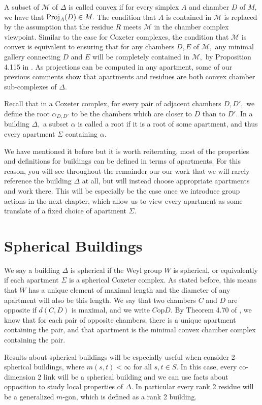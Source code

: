 \documentclass[class=book, crop=false,12 pt]{standalone}
\begin{document}
A subset of $\mathcal{M}$ of $\Delta$ is called convex if for every simplex $A$ and chamber $D$ of $M,$ we have that $\mathrm{Proj}_A(D)\in M.$ The condition that $A$ is contained in $\mathcal{M}$ is replaced by the assumption that the residue $R$ meets $\mathcal{M}$ in the chamber complex viewpoint. Similar to the case for Coxeter complexes, the condition that $\mathcal{M}$ is convex is equivalent to ensuring that for any chambers $D,E$ of $\mathcal{M},$ any minimal gallery connecting $D$ and $E$ will be completely contained in $\mathcal{M},$ by Proposition 4.115 in \cite{buildings}. As projections  can be computed in any apartment, some of our previous comments show that apartments and residues are both convex chamber sub-complexes of $\Delta.$

Recall that in a Coxeter complex, for every pair of adjacent chambers $D,D',$ we define the root $\alpha_{D,D'}$ to be the chambers which are closer to $D$ than to $D'.$ In a building $\Delta,$ a subset $\alpha$ is called a root if it is a root of some apartment, and thus every apartment $\Sigma$ containing $\alpha.$

We have mentioned it before but it is worth reiterating, most of the properties and definitions for buildings can be defined in terms of apartments. For this reason, you will see throughout the remainder our our work that we will rarely reference the building $\Delta$ at all, but will instead choose appropriate apartments and work there. This will be especially be the case once we introduce group actions in the next chapter, which allow us to view every apartment as some translate of a fixed choice of apartment $\Sigma.$

\section{Spherical Buildings}
We say a building $\Delta$ is spherical if the Weyl group $W$ is spherical, or equivalently if each apartment $\Sigma$ is a spherical Coxeter complex. As stated before, this means that $W$ has a unique element of maximal length and the diameter of any apartment will also be this length. We say that two chambers $C$ and $D$ are opposite if $d(C,D)$ is maximal, and we write $C \mathrm{ op }D.$ By Theorem 4.70 of \cite{buildings}, we know that for each pair of opposite chambers, there is a unique apartment containing the pair, and that apartment is the minimal convex chamber complex containing the pair. 

Results about spherical buildings will be especially useful when consider 2-spherical buildings, where $m(s,t)<\infty$ for all $s,t\in S.$ In this case, every co-dimension 2 link will be a spherical building and we can use facts about opposition to study local properties of $\Delta.$ In particular every rank 2 residue will be a generalized $m$-gon, which is defined as a rank 2 building.
\end{document}
